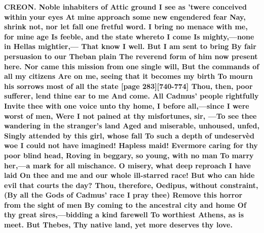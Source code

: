 \documentclass[11pt,letter]{book}
\begin{document}
\par \textbf{CREON. Noble inhabiters of Attic ground I see as ’twere conceived within your eyes At mine approach some new engendered fear Nay, shrink not, nor let fall one fretful word. I bring no menace with me, for mine age Is feeble, and the state whereto I come Is mighty,—none in Hellas mightier,— That know I well. But I am sent to bring By fair persuasion to our Theban plain The reverend form of him now present here. Nor came this mission from one single will, But the commands of all my citizens Are on me, seeing that it becomes my birth To mourn his sorrows most of all the state [page 283][740-774] Thou, then, poor sufferer, lend thine ear to me And come. All Cadmus’ people rightfully Invite thee with one voice unto thy home, I before all,—since I were worst of men, Were I not pained at thy misfortunes, sir, —To see thee wandering in the stranger’s land Aged and miserable, unhoused, unfed, Singly attended by this girl, whose fall To such a depth of undeservèd woe I could not have imagined! Hapless maid! Evermore caring for thy poor blind head, Roving in beggary, so young, with no man To marry her,—a mark for all mischance. O misery, what deep reproach I have laid On thee and me and our whole ill-starred race! But who can hide evil that courts the day? Thou, therefore, Oedipus, without constraint, (By all the Gods of Cadmus’ race I pray thee) Remove this horror from the sight of men By coming to the ancestral city and home Of thy great sires,—bidding a kind farewell To worthiest Athens, as is meet. But Thebes, Thy native land, yet more deserves thy love.}
\par 
\end{document}

